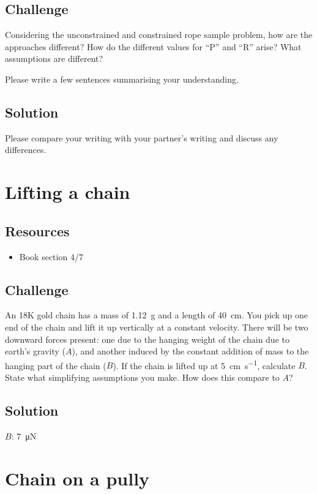 \subsection*{Challenge}
Considering the unconstrained and constrained rope sample problem, how are the approaches different? How do the different values for ``P'' and ``R'' arise? What assumptions are different?

Please write a few sentences summarising your understanding.

\subsection*{Solution}
Please compare your writing with your partner's writing and discuss any differences.



\newpage
\section{Lifting a chain}

\subsection*{Resources}
\begin{itemize}
    \item Book section 4/7
\end{itemize}

\subsection*{Challenge}
An 18K gold chain has a mass of \SI{1.12}{\gram} and a length of \SI{40}{\cm}. You pick up one end of the chain and lift it up vertically at a constant velocity. There will be two downward forces present: one due to the hanging weight of the chain due to earth's gravity ($A$), and another induced by the constant addition of mass to the hanging part of the chain ($B$). If the chain is lifted up at \SI{5}{\cm\per\s}, calculate $B$. State what simplifying assumptions you make. How does this compare to $A$?

\subsection*{Solution}
$B$: \SI{7}{\micro\newton}




\newpage
\section{Chain on a pully}

